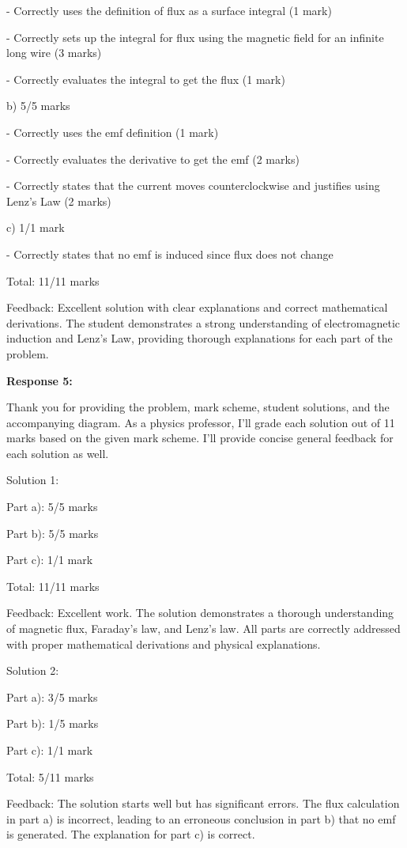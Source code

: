 \documentclass[a4paper,11pt]{article}
\begin{document}
- Correctly uses the definition of flux as a surface integral (1 mark)

- Correctly sets up the integral for flux using the magnetic field for an infinite long wire (3 marks)

- Correctly evaluates the integral to get the flux (1 mark)

b) 5/5 marks

- Correctly uses the emf definition (1 mark)

- Correctly evaluates the derivative to get the emf (2 marks)

- Correctly states that the current moves counterclockwise and justifies using Lenz's Law (2 marks)

c) 1/1 mark

- Correctly states that no emf is induced since flux does not change

Total: 11/11 marks

Feedback: Excellent solution with clear explanations and correct mathematical derivations. The student demonstrates a strong understanding of electromagnetic induction and Lenz's Law, providing thorough explanations for each part of the problem.

\bigskip
\textbf{Response 5:}

Thank you for providing the problem, mark scheme, student solutions, and the accompanying diagram. As a physics professor, I'll grade each solution out of 11 marks based on the given mark scheme. I'll provide concise general feedback for each solution as well.

Solution 1:

Part a): 5/5 marks

Part b): 5/5 marks

Part c): 1/1 mark

Total: 11/11 marks

Feedback: Excellent work. The solution demonstrates a thorough understanding of magnetic flux, Faraday's law, and Lenz's law. All parts are correctly addressed with proper mathematical derivations and physical explanations.

Solution 2:

Part a): 3/5 marks

Part b): 1/5 marks

Part c): 1/1 mark

Total: 5/11 marks

Feedback: The solution starts well but has significant errors. The flux calculation in part a) is incorrect, leading to an erroneous conclusion in part b) that no emf is generated. The explanation for part c) is correct.
\end{document}

